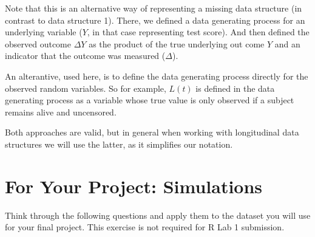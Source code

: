 \documentclass{exam}
\newenvironment{myfigure}{\captionsetup{type=mytype}}{}
\begin{document}
\begin{solution}
Note that this is an alternative way of representing a missing data structure (in contrast to data structure 1). There, we defined a data generating process for an underlying variable ($Y$, in that case representing test score). And then defined the observed outcome $\Delta Y$ as the product of the true underlying out come $Y$ and an indicator that the outcome was measured ($\Delta$).

An alterantive, used here, is to define the data generating process directly for the observed random variables. So for example, $L(t)$ is defined in the data generating process as a variable whose true value is only observed if a subject remains alive and uncensored.

Both approaches are valid, but in general when working with longitudinal data structures we will use the latter, as it simplifies our notation.  


\end{solution}
\pagebreak

\section{For Your Project: Simulations}

Think through the following questions and apply them to the dataset you will use for your final project. This exercise is not required for R Lab 1 submission.
\end{document}
